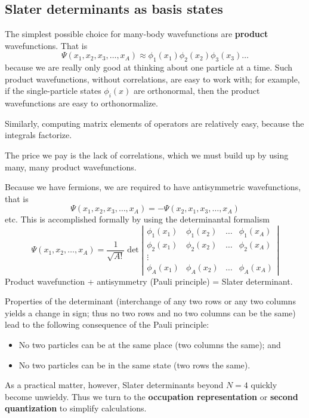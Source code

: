 \subsection{Slater determinants as basis states}

The simplest possible choice for many-body wavefunctions
are \textbf{product} wavefunctions.  That is
\[ 
\Psi(x_1, x_2, x_3, \ldots, x_A) \approx \phi_1(x_1) \phi_2(x_2) \phi_3(x_3) \ldots
\]
because we are really only good  at thinking about one particle at a time. Such 
product wavefunctions, without correlations, are easy to 
work with; for example, if the single-particle states $\phi_i(x)$ are orthonormal, then 
the product wavefunctions are easy to orthonormalize.   

Similarly, computing matrix elements of operators are relatively easy, because the 
integrals factorize.


The price we pay is the lack of correlations, which we must build up by using many, many product 
wavefunctions.


Because we have fermions, we are required to have antisymmetric wavefunctions, that is
\[
\Psi(x_1, x_2, x_3, \ldots, x_A) = - \Psi(x_2, x_1, x_3, \ldots, x_A)
\]
etc. This is accomplished formally by using the determinantal formalism
\[
\Psi(x_1, x_2, \ldots, x_A) 
= \frac{1}{\sqrt{A!}} 
\det \left | 
\begin{array}{cccc}
\phi_1(x_1) & \phi_1(x_2) & \ldots & \phi_1(x_A) \\
\phi_2(x_1) & \phi_2(x_2) & \ldots & \phi_2(x_A) \\
 \vdots & & &  \\
\phi_A(x_1) & \phi_A(x_2) & \ldots & \phi_A(x_A) 
\end{array}
\right |
\]
Product wavefunction + antisymmetry (Pauli principle) = Slater determinant. 


Properties of the determinant (interchange of any two rows or 
any two columns yields a change in sign; thus no two rows and no 
two columns can be the same) lead to the following consequence of the Pauli principle:

\begin{itemize}
\item No two particles can be at the same place (two columns the same); and

\item No two particles can be in the same state (two rows the same).
\end{itemize}

\noindent
As a practical matter, however, Slater determinants beyond $N=4$
quickly become unwieldy. Thus we turn to the \textbf{occupation
representation} or \textbf{second quantization} to simplify
calculations.

